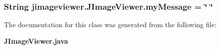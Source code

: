 \subsubsection{\setlength{\rightskip}{0pt plus 5cm}String {\bf jimageviewer.JImage\-Viewer.my\-Message} = \char`\"{} \char`\"{}\hspace{0.3cm}{\tt  [package]}}\label{classjimageviewer_1_1_j_image_viewer_657657965258bd28f1ade33d36906e7f}




The documentation for this class was generated from the following file:\begin{CompactItemize}
\item 
{\bf JImage\-Viewer.java}\end{CompactItemize}
